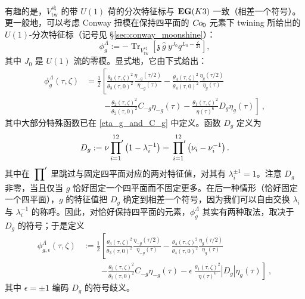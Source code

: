 \documentclass[11pt,a4paper,fontset=windows]{ctexart}
\numberwithin{equation}{section}
\newcommand{\Co}{\operatorname{\textsl{Co}}}      %
\def\e{\epsilon}
\def\f{\phi}
\def\l{\lambda}
\def\n{\nu}
\newcommand{\tr}{\operatorname{Tr}}
\begin{document}
有趣的是，$V^{s\natural}_{\text{tw}}$ 的带 $U(1)$ 荷的分次特征标与 ${\bf EG}(K3)$ 一致（相差一个符号）\cite{MR3465528}。更一般地，可以考虑 Conway 扭模在保持四平面的 $\Co_0$ 元素下 twining 所给出的 $U(1)$-分次特征标（记号见 \S \ref{sec:conway_moonshine}）：
\begin{equation}
\f_g^\Lambda:=-\tr_{V^{s\natural}_{\text{tw}}}\left[\mathfrak{z}~\hat{g}~y^{J_0}q^{L_0-\frac{c}{24}}\right],
\end{equation}
其中 $J_0$ 是 $U(1)$ 流的零模。显式地，它由下式给出：
\begin{equation}
\label{eq:phi_g}
\begin{split}
\f_g^\Lambda(\tau,\zeta)&=\frac{1}{2}\left[\frac{\theta_3(\tau,\zeta)^2}{\theta_3(\tau,0)^2}\frac{\eta_{-g}(\tau/2)}{\eta_{-g}(\tau)}-\frac{\theta_4(\tau,\zeta)^2}{\theta_4(\tau,0)^2}\frac{\eta_{g}(\tau/2)}{\eta_{g}(\tau)}\right. \\
&~~~~~~~~~~\left.-\frac{\theta_2(\tau,\zeta)^2}{\theta_2(\tau,0)^2}C_{-g}\eta_{-g}(\tau)-\frac{\theta_1(\tau,\zeta)^2}{\eta(\tau)^6}D_g\eta_g(\tau)\right]~,
\end{split}
\end{equation}
其中大部分特殊函数已在 \eqref{eta_g_and_C_g} 中定义。函数 $D_g$ 定义为
\begin{equation}
D_g:=\n\sideset{}{'}\prod_{i=1}^{12}\left(1-\l_i^{-1}\right)=\sideset{}{'}\prod_{i=1}^{12}\left(\n_i-\n_i^{-1}\right).
\end{equation}
其中在 $\sideset{}{'}\prod$ 里跳过与固定四平面对应的两对特征值，对其有 $\l_i^{\pm1}=1$。注意 $D_g$ 非零，当且仅当 $g$ 恰好固定一个四平面而不固定更多。在后一种情形（恰好固定一个四平面），$g$ 的特征值把 $D_g$ 确定到相差一个符号，因为我们可以自由交换 $\l_i$ 与 $\l_i^{-1}$ 的称呼。因此，对恰好保持四平面的元素，$\f_g^\Lambda$ 其实有两种取法，取决于 $D_{g}$ 的符号；于是定义
\begin{equation}
\begin{split}\label{eq:phi_epsilon}
\phi^\Lambda_{g,\e}(\tau,\zeta)&:=\frac{1}{2}\left[\frac{\theta_3(\tau,\zeta)^2}{\theta_3(\tau,0)^2}\frac{\eta_{-g}(\tau/2)}{\eta_{-g}(\tau)}-\frac{\theta_4(\tau,\zeta)^2}{\theta_4(\tau,0)^2}\frac{\eta_{g}(\tau/2)}{\eta_{g}(\tau)}\right. \\
&~~~~~~~~~~\left.-\frac{\theta_2(\tau,\zeta)^2}{\theta_2(\tau,0)^2}C_{-g}\eta_{-g}(\tau)-\e~\frac{\theta_1(\tau,\zeta)^2}{\eta(\tau)^6}\left|D_g\right|\eta_g(\tau)\right]~,
\end{split}
\end{equation}
其中 $\e=\pm1$ 编码 $D_g$ 的符号歧义。
\end{document}
